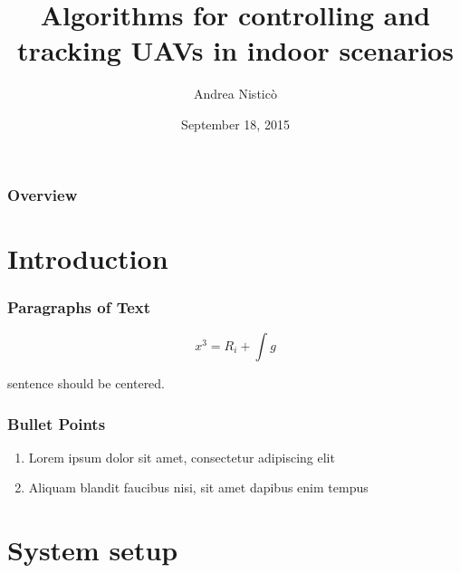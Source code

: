 \documentclass[xcolor=dvipsnames]{beamer}
\title[Algorithms for controlling and tracking UAVs in indoor scenarios]{Algorithms for controlling and tracking UAVs in indoor scenarios}
\author{Andrea Nisticò} %
\institute[UNIGE] %
{
Supervised by: Marco Baglietto, Fulvio Mastrogiovanni \\
Co-supervised by: Tommaso Falchi Delitalia \\
\medskip
DIBRIS - Department of Informatics, Bioengineering, Robotics, and Systems Engineering \\
\smallskip
University of Genova
\medskip

Degree in \textit{Robotics Engineering} 
}
\date{September 18, 2015} %
\begin{document}
\begin{frame}
\titlepage %
\end{frame}

\begin{frame}
\frametitle{Overview} 
\tableofcontents[sectionstyle=show,square]
\end{frame}


\section{Introduction} 

\begin{frame}
\frametitle{Paragraphs of Text}

\begin{equation}
x ^ 3 = R_i + \int g
\end{equation}
\centerline{sentence should be centered.}
\end{frame}


\begin{frame}
\frametitle{Bullet Points}
\begin{enumerate}
\item Lorem ipsum dolor sit amet, consectetur adipiscing elit
\item Aliquam blandit faucibus nisi, sit amet dapibus enim tempus
\end{enumerate}
\end{frame}


\section{System setup}
\begin{frame}
\tableofcontents[sectionstyle=show,square,currentsection]
\end{frame}
\end{document}
